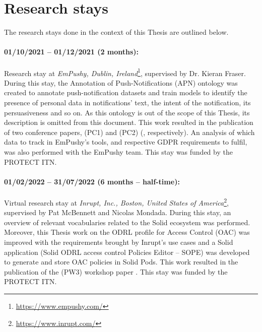 \section{Research stays}
\label{sec:research_stays}

The research stays done in the context of this Thesis are outlined below.

\paragraph{01/10/2021 -- 01/12/2021 (2 months):} Research stay at \textit{EmPushy, Dublin, Ireland}\footnote{\url{https://www.empushy.com/}}, supervised by Dr. Kieran Fraser. During this stay, the Annotation of Push-Notifications (APN) ontology was created to annotate push-notification datasets and train models to identify the presence of personal data in notifications' text, the intent of the notification, its persuasiveness and so on. As this ontology is out of the scope of this Thesis, its description is omitted from this document. This work resulted in the publication of two conference papers, (PC1) and (PC2) (\cite{esteves_extracting_2022, esteves_now_2022}, respectively). An analysis of which data to track in EmPushy's tools, and respective GDPR requirements to fulfil, was also performed with the EmPushy team. This stay was funded by the PROTECT ITN.

\paragraph{01/02/2022 -- 31/07/2022 (6 months -- half-time):} Virtual research stay at \textit{Inrupt, Inc., Boston, United States of America}\footnote{\url{https://www.inrupt.com/}}, supervised by Pat McBennett and Nicolas Mondada. During this stay, an overview of relevant vocabularies related to the Solid ecosystem was performed. Moreover, this Thesis work on the ODRL profile for Access Control (OAC) was improved with the requirements brought by Inrupt's use cases and a Solid application (Solid ODRL access control Policies Editor -- SOPE) was developed to generate and store OAC policies in Solid Pods. This work resulted in the publication of the (PW3) workshop paper \citep{esteves_using_2022}. This stay was funded by the PROTECT ITN.

